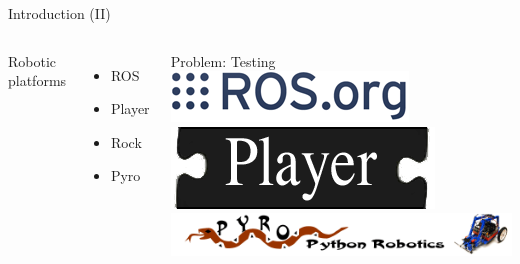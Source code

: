 \documentclass[10pt,compress]{beamer} %
\begin{document}
\begin{frame}{Introduction (II)}
    \begin{columns}
		Robotic platforms

 	 	\begin{itemize}
		\item ROS
        \item Player
		\item Rock
		\item Pyro
		\end{itemize}

		Problem: Testing
		\centering\includegraphics[width=\linewidth]{figs/ros.png}\\
		\vspace{0.5cm}
		\centering\includegraphics[width=\linewidth]{figs/player.png}\\
		\vspace{0.5cm}
		\centering\includegraphics[width=\linewidth]{figs/PyroLogo-0.png}\\
	\end{columns}
\end{frame}
\end{document}
